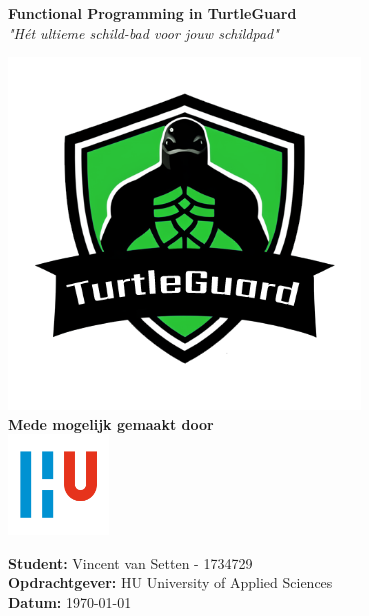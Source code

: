 \documentclass[a4paper]{report}
\newcommand{\turtleguard}{\mbox{TurtleGuard\texttrademark}\xspace}
\begin{document}
\begin{titlepage}
    \begin{center}
        \vspace*{.9cm}
        \Huge
        \textbf{ Functional Programming in \turtleguard }\\
        \vspace{0.2cm}
        \small\textit{"Hét ultieme schild-bad voor jouw schildpad"}

        \normalsize


        
        \includegraphics[width=0.7\textwidth]{Images/turtleguard.png}
        \vspace{1cm}
        \Large\\
        \textbf{Mede mogelijk gemaakt door} \\
        \includegraphics[width=0.2\textwidth]{Images/logouni.png}


        \vfill
      \end{center}
        \textbf{Student:} Vincent van Setten - 1734729 \\
        \textbf{Opdrachtgever:} HU University of Applied Sciences\\
        \textbf{Datum:} \today \\
        \vspace{2cm}
\end{titlepage}
\end{document}
